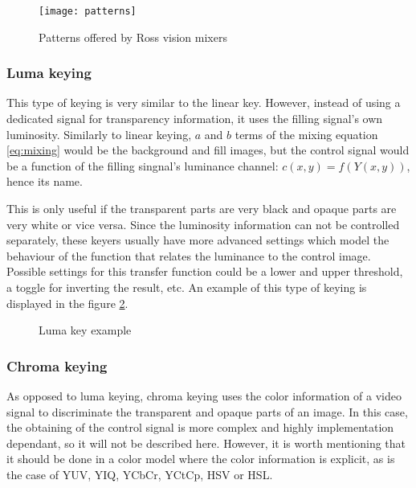 \documentclass[../main.tex]{subfiles}
\begin{document}
\begin{figure}[htbp]
    \centering
    \texttt{[image: patterns]}
    \caption{Patterns offered by Ross vision mixers}
    \label{fig:02:patterns}
\end{figure}

\subsubsection{Luma keying}
This type of keying is very similar to the linear key. However, instead of using a dedicated signal for transparency information, it uses the filling signal's own luminosity. Similarly to linear keying, $a$ and $b$ terms of the mixing equation \eqref{eq:mixing} would be the background and fill images, but the control signal would be a function of the filling singnal's luminance channel: $c(x, y) = f(Y(x, y))$, hence its name.\newline

This is only useful if the transparent parts are very black and opaque parts are very white or vice versa. Since the luminosity information can not be controlled separately, these keyers usually have more advanced settings which model the behaviour of the function that relates the luminance to the control image. Possible settings for this transfer function could be a lower and upper threshold, a toggle for inverting the result, etc. An example of this type of keying is displayed in the figure \ref{fig:02:luma_key_example}.

\begin{figure}[htbp]
    \centering

    \caption{Luma key example}
    \label{fig:02:luma_key_example}
\end{figure}

\subsubsection{Chroma keying}
As opposed to luma keying, chroma keying uses the color information of a video signal to discriminate the transparent and opaque parts of an image. In this case, the obtaining of the control signal is more complex and highly implementation dependant, so it will not be described here. However, it is worth mentioning that it should be done in a color model where the color information is explicit, as is the case of YUV, YIQ, YCbCr, YCtCp, HSV or HSL.\newline
\end{document}
